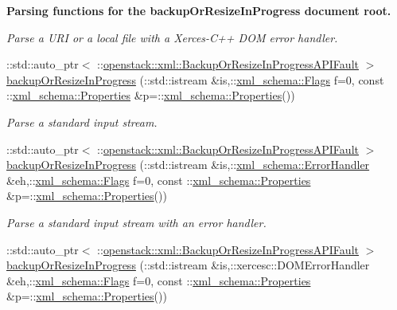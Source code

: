 \begin{Indent}{\bf Parsing functions for the backupOrResizeInProgress document root.}
\begin{DoxyCompactItemize}
\begin{DoxyCompactList}\small\item\em Parse a URI or a local file with a Xerces-\/C++ DOM error handler. \item\end{DoxyCompactList}\item 
::std::auto\_\-ptr$<$ ::\hyperlink{classopenstack_1_1xml_1_1BackupOrResizeInProgressAPIFault}{openstack::xml::BackupOrResizeInProgressAPIFault} $>$ \hyperlink{namespaceopenstack_1_1xml_a052ac3128e58f3feedebb52fc9f06d3b}{backupOrResizeInProgress} (::std::istream \&is,::\hyperlink{namespacexml__schema_affb4c227cbd9aa7453dd1dc5a1401943}{xml\_\-schema::Flags} f=0, const ::\hyperlink{namespacexml__schema_ad27ce19a7ee1d3b1064092648898f64c}{xml\_\-schema::Properties} \&p=::\hyperlink{namespacexml__schema_ad27ce19a7ee1d3b1064092648898f64c}{xml\_\-schema::Properties}())
\begin{DoxyCompactList}\small\item\em Parse a standard input stream. \item\end{DoxyCompactList}\item 
::std::auto\_\-ptr$<$ ::\hyperlink{classopenstack_1_1xml_1_1BackupOrResizeInProgressAPIFault}{openstack::xml::BackupOrResizeInProgressAPIFault} $>$ \hyperlink{namespaceopenstack_1_1xml_a1e8454c860724fd48ff11140e4960dc1}{backupOrResizeInProgress} (::std::istream \&is,::\hyperlink{namespacexml__schema_ab1c9361bfd3b404eaabf0c31eded79dc}{xml\_\-schema::ErrorHandler} \&eh,::\hyperlink{namespacexml__schema_affb4c227cbd9aa7453dd1dc5a1401943}{xml\_\-schema::Flags} f=0, const ::\hyperlink{namespacexml__schema_ad27ce19a7ee1d3b1064092648898f64c}{xml\_\-schema::Properties} \&p=::\hyperlink{namespacexml__schema_ad27ce19a7ee1d3b1064092648898f64c}{xml\_\-schema::Properties}())
\begin{DoxyCompactList}\small\item\em Parse a standard input stream with an error handler. \item\end{DoxyCompactList}\item 
::std::auto\_\-ptr$<$ ::\hyperlink{classopenstack_1_1xml_1_1BackupOrResizeInProgressAPIFault}{openstack::xml::BackupOrResizeInProgressAPIFault} $>$ \hyperlink{namespaceopenstack_1_1xml_a6f239d475f413282cccc91c0bd656fa9}{backupOrResizeInProgress} (::std::istream \&is,::xercesc::DOMErrorHandler \&eh,::\hyperlink{namespacexml__schema_affb4c227cbd9aa7453dd1dc5a1401943}{xml\_\-schema::Flags} f=0, const ::\hyperlink{namespacexml__schema_ad27ce19a7ee1d3b1064092648898f64c}{xml\_\-schema::Properties} \&p=::\hyperlink{namespacexml__schema_ad27ce19a7ee1d3b1064092648898f64c}{xml\_\-schema::Properties}())

\end{DoxyCompactItemize}
\end{Indent}
